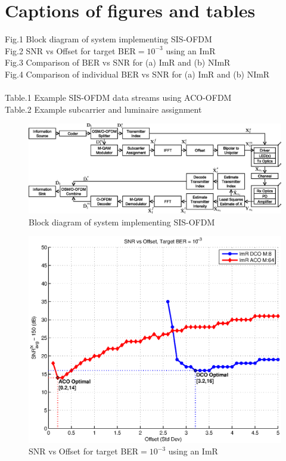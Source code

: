 \documentclass[12pt,letterpaper,onecolumn]{article} %
\begin{document}
\section*{Captions of figures and tables}
Fig.1 Block diagram of system implementing SIS-OFDM\\
Fig.2 SNR vs Offset for target BER$= 10^{-3}$ using an ImR\\
Fig.3 Comparison of BER vs SNR for (a) ImR and (b) NImR\\
Fig.4 Comparison of individual BER vs SNR for (a) ImR and (b) NImR\\
\\
Table.1 Example SIS-OFDM data streams using ACO-OFDM\\
Table.2 Example subcarrier and luminaire assignment\\

\setcounter{figure}{0}

\newpage
\begin{figure}[htp]
	\centering
		\includegraphics[trim={0.0in 0.0in 0.0in 0.0in}, clip=false, width=6.6in]{figBlockDiagram2.eps}
	\caption{Block diagram of system implementing SIS-OFDM}
\end{figure}

\newpage
\begin{figure}[htp]
	\centering
		\includegraphics[trim={0.45in 0.25in 0.7in 0.0in}, clip=false, width=5in]{figSNRvsOfst.eps}
	\caption{SNR vs Offset for target BER$= 10^{-3}$ using an ImR}
\end{figure}
\end{document}
